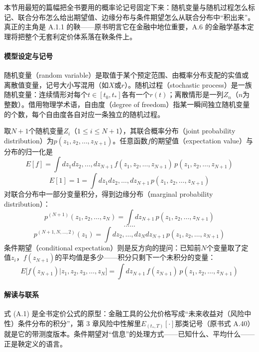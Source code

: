 本节用最短的篇幅把全书要用的概率论记号固定下来：随机变量与随机过程怎么标记、联合分布怎么给出期望值、边缘分布与条件期望怎么从联合分布中“积出来”。真正的主角是 A.1.1 的鞅——原书明言它在金融中地位重要，A.6 的金融学基本定理将把整个无套利定价体系落在鞅条件上。

\paragraph{模型设定与记号}
随机变量（random variable）是取值于某个预定范围、由概率分布支配的实值或离散值变量，记号大小写混用（如$X$或$r$）。随机过程（stochastic process）是一族随机变量：连续情形对每个$t\in[t_0,t_*]$各有一个$r(t)$；离散情形是一列$Z_n$（$n$为整数）。借用物理学术语，自由度（degree of freedom）指某一瞬间独立随机变量的个数，每个自由度各自对应一条独立的随机过程。

取$N+1$个随机变量$Z_i$（$1\le i\le N+1$），其联合概率分布（joint probability distribution）为$p(z_1,z_2,\ldots,z_{N+1})$。任意函数$f$的期望值（expectation value）与分布的归一化是
\begin{equation*}
E[f]=\int dz_1 dz_2,\ldots,dz_{N+1}\,
f(z_1,z_2,\ldots,z_{N+1})\,p(z_1,z_2,\ldots,z_{N+1})
\end{equation*}
\begin{equation*}
E[1]=1=\int dz_1 dz_2,\ldots,dz_{N+1}\,p(z_1,z_2,\ldots,z_{N+1})
\end{equation*}
对联合分布中一部分变量积分，得到边缘分布（marginal probability distribution）：
\begin{equation*}
p^{(N+1)}(z_1,z_2,\ldots,z_N)=\int dz_{N+1}\,
p(z_1,z_2,\ldots,z_{N+1})
\end{equation*}
\begin{equation*}
\ldots\ldots
\end{equation*}
\begin{equation*}
p^{(N+1,N,\ldots,2)}(z_1)=\int dz_2,\ldots,dz_N dz_{N+1}\,
p(z_1,z_2,\ldots,z_{N+1})
\end{equation*}
条件期望（conditional expectation）则是反方向的提问：已知前$N$个变量取了定值$z_i$，$f(z_{N+1})$的平均值是多少——积分只剩下一个未积分的变量：
\begin{equation*}
E\bigl[f(z_{N+1})|z_1,z_2,z_3,\ldots,z_N\bigr]
=\int dz_{N+1}\,f(z_{N+1})\,p(z_1,z_2,\ldots,z_{N+1})
\tag{A.1}
\end{equation*}

\paragraph{解读与联系}
式 (A.1) 是全书定价公式的原型：金融工具的公允价格写成“未来收益对（风险中性）条件分布的积分”，第 3 章风险中性解里$E_{(t_*,T)}[\cdot]$那类记号（原书式 A.40）就是它的带测度版本。条件期望对“信息”的处理方式——已知什么、平均什么——正是鞅定义的语言。

